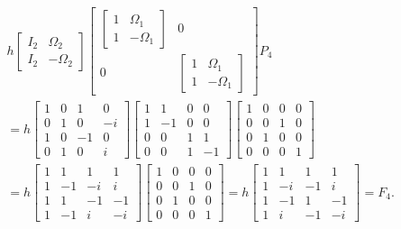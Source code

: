 \documentclass{article}
\begin{document}
\[
\begin{split}
&h \left[ \begin{array}{cc} I_2 & \Omega_2 \\ I_2 & - \Omega_2 \end{array}
\right]
\left[ \begin{array}{cc}
\left[ \begin{array}{cc} 1 & \Omega_1 \\ 1 & - \Omega_1 \end{array} \right] & 0 \\
0 & \left[ \begin{array}{cc} 1 & \Omega_1 \\ 1 & - \Omega_1 \end{array} \right]
\end{array} \right] P_4 \\&=
h \left[ \begin{array}{cccc}1&0&1&0\\
0&1&0&-i\\
1&0&-1&0\\
0&1&0&i\end{array}\right] \left[ \begin{array}{cccc}1&1&0&0\\
1&-1&0&0\\
0&0&1&1\\
0&0&1&-1\end{array}\right] \left[ \begin{array}{cccc}1&0&0&0\\
0&0&1&0\\
0&1&0&0\\
0&0&0&1\end{array}\right] \\&=
h\left[ \begin{array}{cccc}1&1&1&1\\
1&-1&-i&i\\
1&1&-1&-1\\
1&-1&i&-i\end{array}\right] \left[ \begin{array}{cccc}1&0&0&0\\
0&0&1&0\\
0&1&0&0\\
0&0&0&1\end{array}\right] = h \left[ \begin{array}{cccc}1&1&1&1\\
1&-i&-1&i\\
1&-1&1&-1\\
1&i&-1&-i\end{array}
\right] = F_4.
\end{split}
\] 
\end{document}
